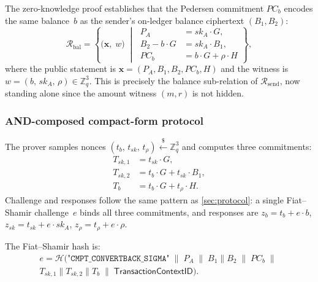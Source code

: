 \documentclass[11pt]{article}
\theoremstyle{definition}
\newcommand{\Zq}{\mathbb{Z}_q}
\newcommand{\sk}{\mathit{sk}}
\newcommand{\TransCtx}{\textsf{TransactionContextID}}
\begin{document}
The zero-knowledge proof establishes that the Pedersen commitment
$\mathit{PC}_b$ encodes the same balance~$b$ as the sender's
on-ledger balance ciphertext $(B_1, B_2)$:
\begin{equation}
  \label{eq:convertback-relation}
  \mathcal{R}_{\mathrm{bal}} = \left\{
  \bigl(\mathbf{x},\; w\bigr)
  \;\middle|\;
  \begin{aligned}
    P_A &= \sk_A \cdot G, \\
    B_2 - b \cdot G &= \sk_A \cdot B_1, \\
    \mathit{PC}_b &= b \cdot G + \rho \cdot H
  \end{aligned}
  \right\},
\end{equation}
where the public statement is
$\mathbf{x} = (P_A, B_1, B_2, \mathit{PC}_b, H)$ and the witness is
$w = (b,\, \sk_A,\, \rho) \in \Zq^3$.
This is precisely the balance sub-relation of
$\mathcal{R}_{\mathrm{send}}$, now standing alone since the amount
witness $(m, r)$ is not hidden.

\subsubsection*{AND-composed compact-form protocol}

The prover samples nonces $(t_b,\, t_{\sk},\, t_\rho)
\xleftarrow{\$} \Zq^3$ and computes three commitments:
\begin{align*}
  T_{\sk,1} &= t_{\sk} \cdot G, \\
  T_{\sk,2} &= t_b \cdot G + t_{\sk} \cdot B_1, \\
  T_b &= t_b \cdot G + t_\rho \cdot H.
\end{align*}
Challenge and responses follow the same pattern as
\cref{sec:protocol}: a single Fiat--Shamir challenge~$e$ binds all
three commitments, and responses are
$z_b = t_b + e \cdot b$,
$z_{\sk} = t_{\sk} + e \cdot \sk_A$,
$z_\rho = t_\rho + e \cdot \rho$.

The Fiat--Shamir hash is:
\begin{multline}
  \label{eq:cb-fs-hash}
  e = \mathcal{H}\!\bigl(
    \texttt{"CMPT\_CONVERTBACK\_SIGMA"} \;\|\;
    P_A \;\|\; B_1 \| B_2 \;\|\;
    \mathit{PC}_b \;\|\; \\
    T_{\sk,1} \| T_{\sk,2} \| T_b \;\|\;
    \TransCtx
  \bigr).
\end{multline}
\end{document}
